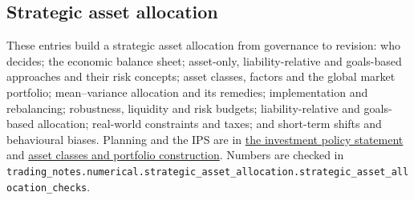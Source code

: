 \subsection{Strategic asset allocation}

These entries build a strategic asset allocation from governance to revision: who decides; the economic balance sheet; asset-only, liability-relative and goals-based approaches and their risk concepts; asset classes, factors and the global market portfolio; mean--variance allocation and its remedies; implementation and rebalancing; robustness, liquidity and risk budgets; liability-relative and goals-based allocation; real-world constraints and taxes; and short-term shifts and behavioural biases. Planning and the IPS are in \hyperref[meth:investment-policy-statement]{the investment policy statement} and \hyperref[meth:asset-class-portfolio-construction]{asset classes and portfolio construction}. Numbers are checked in \nolinkurl{trading_notes.numerical.strategic_asset_allocation.strategic_asset_allocation_checks}.

